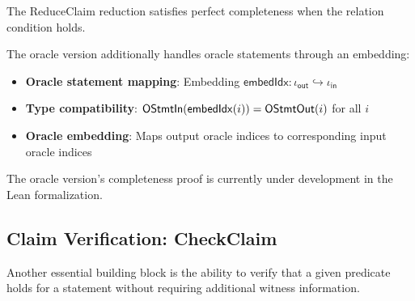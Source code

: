 \begin{theorem}
    The ReduceClaim reduction satisfies perfect completeness when the relation condition holds.
\end{theorem}

\begin{definition}
    \label{def:reduceclaim_oracle_reduction}
    The oracle version additionally handles oracle statements through an embedding:
    \begin{itemize}
        \item \textbf{Oracle statement mapping}: Embedding $\mathsf{embedIdx} : \iota_{\mathsf{out}} \hookrightarrow \iota_{\mathsf{in}}$
        \item \textbf{Type compatibility}: $\mathsf{OStmtIn}(\mathsf{embedIdx}(i)) = \mathsf{OStmtOut}(i)$ for all $i$
        \item \textbf{Oracle embedding}: Maps output oracle indices to corresponding input oracle indices
    \end{itemize}
\end{definition}

\begin{remark}
    The oracle version's completeness proof is currently under development in the Lean formalization.
\end{remark}

\subsection{Claim Verification: CheckClaim}

Another essential building block is the ability to verify that a given predicate holds for a statement without requiring additional witness information.


